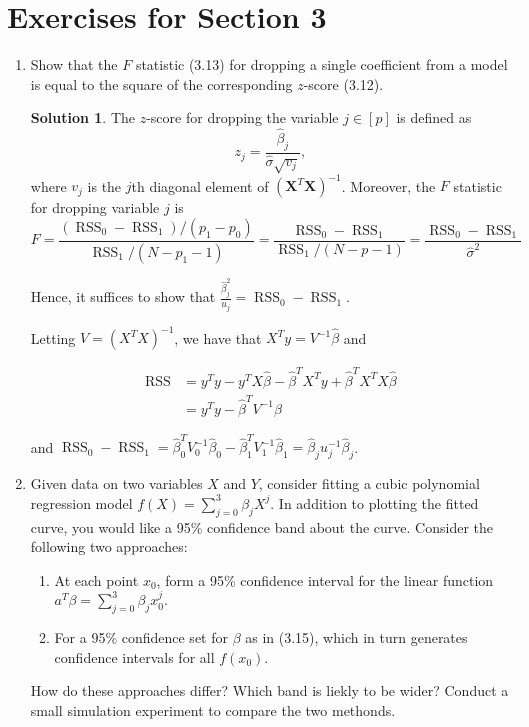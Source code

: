 \documentclass[]{book}
\theoremstyle{definition}
\newtheorem*{soln}{Solution}
\newcommand{\XX}{\mathbf{X}} \newcommand{\YY}{\mathbf{Y}}
\DeclareMathOperator*{\RSS}{RSS} \DeclareMathOperator*{\WRSS}{WRSS}
\begin{document}
\section*{Exercises for Section 3}

\begin{enumerate}
	\item\label{ex:3.1} Show that the $F$ statistic (3.13) for dropping a
	single coefficient from a model is equal to the square of the
	corresponding $z$-score (3.12).

	\begin{soln}
	  The $z$-score for dropping the variable $j\in[p]$ is defined as
	  \[z_j=\frac{\hat\beta_j}{\hat\sigma\sqrt{v_j}},\] where $v_j$ is the
	  $j$th diagonal element of $(\XX^T\XX)^{-1}$. Moreover, the $F$
	  statistic for dropping variable $j$ is 
	  \[F=\frac{(\RSS_0-\RSS_1)/(p_1-p_0)}{\RSS_1/(N-p_1-1)}=\frac{\RSS_0-\RSS_1}{\RSS_1/(N-p-1)}=\frac{\RSS_0-\RSS_1}{\hat\sigma^2}\]
	
	  Hence, it suffices to show that $\frac{\hat\beta_j^2}{u_j}=\RSS_0-\RSS_1$.

	  Letting $V=(X^TX)^{-1}$, we have that $X^Ty=V^{-1}\hat\beta$ and

	  \begin{equation}
		\begin{split}
			\RSS &= y^Ty-y^TX\hat\beta-\hat\beta^TX^Ty+\hat\beta^TX^TX\hat\beta \\
			&= y^Ty - \hat\beta^T V^{-1}\hat\beta
		\end{split}
	  \end{equation}

	  and $\RSS_0-\RSS_1=\hat\beta_0^TV_0^{-1}\hat\beta_0-\hat\beta_1^TV_1^{-1}\hat\beta_1=\hat\beta_ju_j^{-1}\hat\beta_j$.
	
	\end{soln}

	\item\label{ex:3.2} Given data on two variables $X$ and $Y$,
	consider fitting a cubic polynomial regression model
	$f(X)=\sum_{j=0}^3\beta_jX^j$. In addition to plotting the fitted curve,
	you would like a 95\% confidence band about the curve. Consider the
	following two approaches:
	\begin{enumerate}
		\item At each point $x_0$, form a 95\% confidence interval for 
		the linear function $a^T\beta=\sum_{j=0}^3\beta_jx_0^j$.
		\item For a 95\% confidence set for $\beta$ as in (3.15), which in 
		turn generates confidence intervals for all $f(x_0)$.
	\end{enumerate}
	How do these approaches differ? Which band is liekly to be wider?
	Conduct a small simulation experiment to compare the two methonds.


\end{enumerate}
\end{document}
